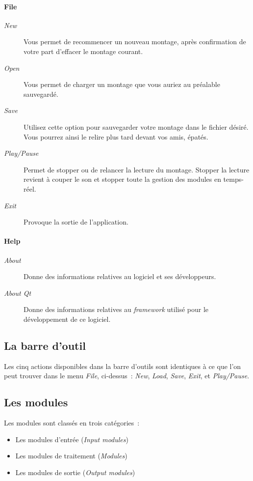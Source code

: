 \documentclass[a4paper,oneside,frenchb,10pt]{article}
\begin{document}
\paragraph{File}
\begin{description}
\item[\emph{New}]
  Vous permet de recommencer un nouveau montage, après
  confirmation de votre part d'effacer le montage courant.
\item[\emph{Open}]
  Vous permet de charger un montage que vous auriez au préalable
  sauvegardé.
\item[\emph{Save}]
  Utilisez cette option pour sauvegarder votre montage dans le
  fichier désiré. Vous pourrez ainsi le relire plus tard devant vos
  amis, épatés.
\item[\emph{Play/Pause}]
  Permet de stopper ou de relancer la lecture du montage.
  Stopper la lecture revient à couper le son et stopper toute la gestion
  des modules en temps-réel.
\item[\emph{Exit}]
  Provoque la sortie de l'application.
\end{description}

\paragraph{Help}
\begin{description}
\item[\emph{About}]
  Donne des informations relatives au logiciel et ses
  développeurs.
\item[\emph{About Qt}]
  Donne des informations relatives au \emph{framework} utilisé pour
  le développement de ce logiciel.
\end{description}

\subsection{La barre d'outil}

Les cinq actions disponibles dans la barre d'outils sont identiques à ce
que l'on peut trouver dans le menu \emph{File}, ci-dessus~: \emph{New}, \emph{Load}, \emph{Save},
\emph{Exit}, et \emph{Play/Pause}.

\subsection{Les modules}

Les modules sont classés en trois catégories~:

\begin{itemize}
\item
  Les modules d'entrée (\emph{Input modules})
\item
  Les modules de traitement (\emph{Modules})
\item
  Les modules de sortie (\emph{Output modules})
\end{itemize}
\end{document}
